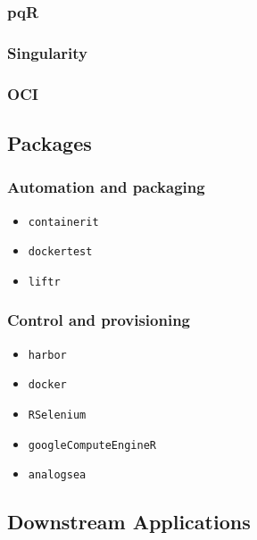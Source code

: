 \subsubsection{pqR}\label{pqr}

\subsubsection{Singularity}\label{singularity}

\subsubsection{OCI}\label{oci}

\subsection{Packages}\label{packages}

\subsubsection{Automation and packaging}\label{automation-and-packaging}

\begin{itemize}
\tightlist
\item
  \texttt{containerit}
\item
  \texttt{dockertest}
\item
  \texttt{liftr}
\end{itemize}

\subsubsection{Control and provisioning}\label{control-and-provisioning}

\begin{itemize}
\tightlist
\item
  \texttt{harbor}
\item
  \texttt{docker}
\item
  \texttt{RSelenium}
\item
  \texttt{googleComputeEngineR}
\item
  \texttt{analogsea}
\end{itemize}

\subsection{Downstream Applications}\label{downstream-applications}

